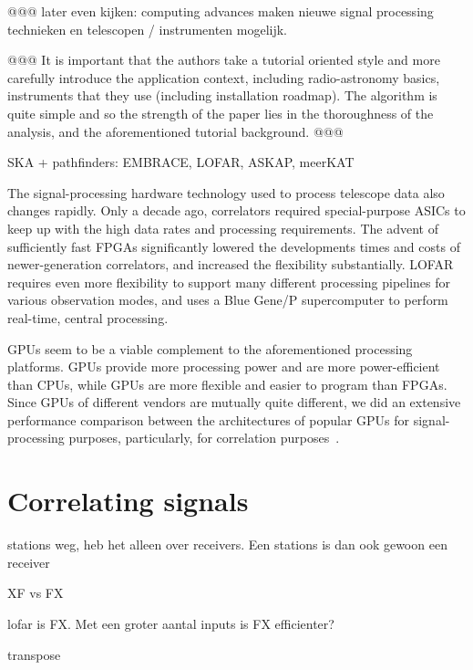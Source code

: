 \documentclass{article}
\begin{document}
@@@ later even kijken: computing advances maken nieuwe signal processing technieken en telescopen / instrumenten mogelijk.



@@@
It is important that the authors take a tutorial 
oriented style and more carefully introduce the 
application context, including radio-astronomy 
basics, instruments that they use (including 
installation roadmap).  The algorithm is quite 
simple and so the strength of the paper lies in 
the thoroughness of the analysis, and the 
aforementioned tutorial background.
@@@

SKA + pathfinders: EMBRACE, LOFAR, ASKAP, meerKAT





The signal-processing hardware technology used to process telescope data
also changes rapidly.
Only a decade ago, correlators required special-purpose ASICs to keep up with
the high data rates and processing requirements.
The advent of sufficiently fast FPGAs significantly lowered the developments
times and costs of newer-generation correlators, and increased the flexibility
substantially.
LOFAR requires even more flexibility to support many different processing
pipelines for various observation modes, and uses a Blue Gene/P supercomputer
to perform real-time, central processing.

GPUs seem to be a viable complement to the aforementioned processing platforms.
GPUs provide more processing power and are more power-efficient than CPUs,
while GPUs are more flexible and easier to program than FPGAs.
Since GPUs of different vendors are mutually quite different, we did an
extensive performance comparison between the architectures of popular GPUs 
for signal-processing purposes, particularly, for correlation
purposes~\cite{Nieuwpoort:09}.




\section{Correlating signals}

stations weg, heb het alleen over receivers. Een stations is dan ook gewoon een receiver


XF vs FX

lofar is FX. Met een groter aantal inputs is FX efficienter?

transpose
\end{document}
